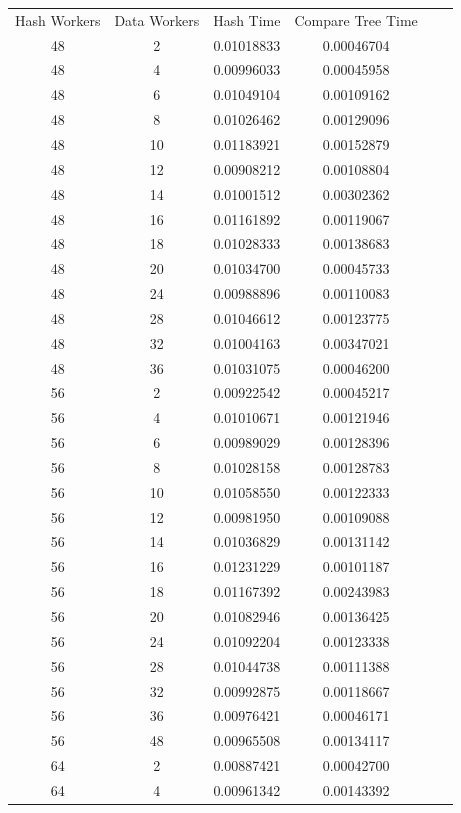 \documentclass[letterpaper,12pt]{article}
\theoremstyle{remark}
\begin{document}
\begin{tabular}{cccccc}

Hash Workers & Data Workers & Hash Time & Compare Tree Time \\

48 & 2 & 0.01018833 & 0.00046704 \\
48 & 4 & 0.00996033 & 0.00045958 \\
48 & 6 & 0.01049104 & 0.00109162 \\
48 & 8 & 0.01026462 & 0.00129096 \\
48 & 10 & 0.01183921 & 0.00152879 \\
48 & 12 & 0.00908212 & 0.00108804 \\
48 & 14 & 0.01001512 & 0.00302362 \\
48 & 16 & 0.01161892 & 0.00119067 \\
48 & 18 & 0.01028333 & 0.00138683 \\
48 & 20 & 0.01034700 & 0.00045733 \\
48 & 24 & 0.00988896 & 0.00110083 \\
48 & 28 & 0.01046612 & 0.00123775 \\
48 & 32 & 0.01004163 & 0.00347021 \\
48 & 36 & 0.01031075 & 0.00046200 \\
56 & 2 & 0.00922542 & 0.00045217 \\
56 & 4 & 0.01010671 & 0.00121946 \\
56 & 6 & 0.00989029 & 0.00128396 \\
56 & 8 & 0.01028158 & 0.00128783 \\
56 & 10 & 0.01058550 & 0.00122333 \\
56 & 12 & 0.00981950 & 0.00109088 \\
56 & 14 & 0.01036829 & 0.00131142 \\
56 & 16 & 0.01231229 & 0.00101187 \\
56 & 18 & 0.01167392 & 0.00243983 \\
56 & 20 & 0.01082946 & 0.00136425 \\
56 & 24 & 0.01092204 & 0.00123338 \\
56 & 28 & 0.01044738 & 0.00111388 \\
56 & 32 & 0.00992875 & 0.00118667 \\
56 & 36 & 0.00976421 & 0.00046171 \\
56 & 48 & 0.00965508 & 0.00134117 \\
64 & 2 & 0.00887421 & 0.00042700 \\
64 & 4 & 0.00961342 & 0.00143392 \\

\end{tabular}
\end{document}
